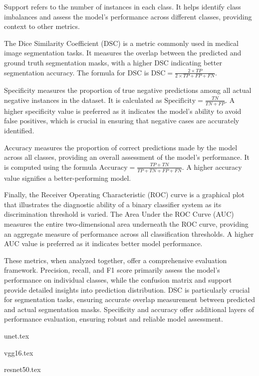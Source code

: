 Support refers to the number of instances in each class. It helps identify class imbalances and assess the model's performance across different classes, providing context to other metrics.

The Dice Similarity Coefficient (DSC) is a metric commonly used in medical image segmentation tasks. It measures the overlap between the predicted and ground truth segmentation masks, with a higher DSC indicating better segmentation accuracy. The formula for DSC is \(\text{DSC} = \frac{2 \times TP}{2 \times TP + FP + FN}\).

Specificity measures the proportion of true negative predictions among all actual negative instances in the dataset. It is calculated as \(\text{Specificity} = \frac{TN}{TN + FP}\). A higher specificity value is preferred as it indicates the model's ability to avoid false positives, which is crucial in ensuring that negative cases are accurately identified.

Accuracy measures the proportion of correct predictions made by the model across all classes, providing an overall assessment of the model's performance. It is computed using the formula \(\text{Accuracy} = \frac{TP + TN}{TP + TN + FP + FN}\). A higher accuracy value signifies a better-performing model.

Finally, the Receiver Operating Characteristic (ROC) curve is a graphical plot that illustrates the diagnostic ability of a binary classifier system as its discrimination threshold is varied. The Area Under the ROC Curve (AUC) measures the entire two-dimensional area underneath the ROC curve, providing an aggregate measure of performance across all classification thresholds. A higher AUC value is preferred as it indicates better model performance.

These metrics, when analyzed together, offer a comprehensive evaluation framework. Precision, recall, and F1 score primarily assess the model's performance on individual classes, while the confusion matrix and support provide detailed insights into prediction distribution. DSC is particularly crucial for segmentation tasks, ensuring accurate overlap measurement between predicted and actual segmentation masks. Specificity and accuracy offer additional layers of performance evaluation, ensuring robust and reliable model assessment.




{unet.tex}

{vgg16.tex}

{resnet50.tex}
